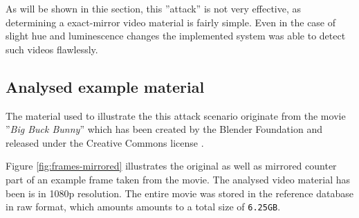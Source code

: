 As will be shown in thie section, this ''attack'' is not very effective, as determining a exact-mirror video material is fairly simple. Even in the case of slight hue and luminescence changes the implemented system was able to detect such videos flawlessly.

\subsection{Analysed example material}
The material used to illustrate the this attack scenario originate from the movie ''\textit{Big Buck Bunny}'' \cite{big-buck-bunny} which has been created by the Blender Foundation \cite{blender-foundation} and released under the Creative Commons license \cite{creative-commons}. 

Figure \ref{fig:frames-mirrored} illustrates the original as well as mirrored counter part of an example frame taken from the movie. The analysed video material has been is in 1080p resolution. The entire movie was stored in the reference database in raw format, which amounts amounts to a total size of \verb|6.25GB|.


